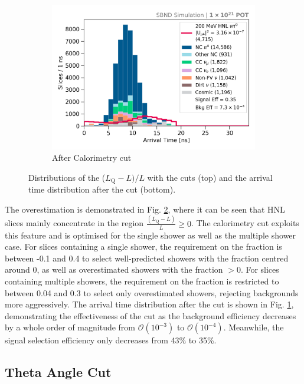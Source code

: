 \begin{figure}[bp!]
\begin{subfigure}[b]{0.495\textwidth}
            \includegraphics[width=\textwidth]{beam_bucket_postopt0}
            \caption{After Calorimetry cut}%
	    \label{fig:bb_opt0}
        \end{subfigure}
	\caption[Calorimetry Cut]{
	Distributions of the ($L_{\mathrm{Q}} - L)/L$ with the cuts (top) and the arrival time distribution after the cut (bottom). 
	}
        \label{fig:opt0_cut}
\end{figure}

The overestimation is demonstrated in Fig. \ref{fig:opt0_cut}, where it can be seen that HNL slices mainly concentrate in the region $\frac{(L_{\mathrm{Q}} - L)}{L} \geq 0$. 
The calorimetry cut exploits this feature and is optimised for the single shower as well as the multiple shower case.
For slices containing a single shower, the requirement on the fraction is between -0.1 and 0.4 to select well-predicted showers with the fraction centred around 0, as well as overestimated showers with the fraction $> 0$. 
For slices containing multiple showers, the requirement on the fraction is restricted to between 0.04 and 0.3 to select only overestimated showers, rejecting backgrounds more aggressively.
The arrival time distribution after the cut is shown in Fig. \ref{fig:bb_opt0}, demonstrating the effectiveness of the cut as the background efficiency decreases by a whole order of magnitude from $\mathcal{O}(10^{-3})$ to $\mathcal{O}(10^{-4})$. 
Meanwhile, the signal selection efficiency only decreases from 43\% to 35\%.

\subsection{Theta Angle Cut}
\label{sec:theta_cut}

